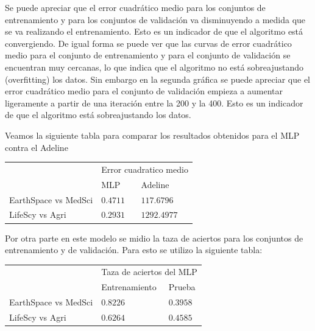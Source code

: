 \documentclass{article}
\theoremstyle{mytheoremstyle}
\theoremstyle{mytheoremstyle}
\theoremstyle{myproblemstyle}
\begin{document}
\newpage
Se puede  apreciar que el error cuadrático medio para los conjuntos de entrenamiento y para los conjuntos de validación va disminuyendo a medida que se va realizando el entrenamiento. Esto es un indicador de que el algoritmo está convergiendo. De igual forma se puede ver que las curvas de error cuadrático medio para el conjunto de entrenamiento y para el conjunto de validación se encuentran muy cercanas, lo que indica que el algoritmo no está sobreajustando (overfitting) los datos. Sin embargo en la segunda gráfica se puede apreciar que el error cuadrático medio para el conjunto de validación empieza a aumentar ligeramente a partir de una iteración entre la 200 y la 400. Esto es un indicador de que el algoritmo está sobreajustando los datos.

Veamos la siguiente tabla para comparar los resultados obtenidos para el MLP contra el Adeline

\begin{table}[!h]
  \centering
  \begin{tabular}{lll}
    \cline{2-3}
                         & \multicolumn{2}{l}{Error cuadratico medio}               \\ \cline{2-3}
                         & MLP                                        & Adeline     \\ \hline
    EarthSpace vs MedSci & $0.4711$                                   & $117.6796$  \\ \hline
    LifeScy vs Agri      & $0.2931$                                   & $1292.4977$ \\ \hline
  \end{tabular}
\end{table}

Por otra parte en este modelo se midio la taza de aciertos para los conjuntos de entrenamiento y de validación. Para esto se utilizo la siguiente tabla:

\begin{table}[!h]
  \centering
  \begin{tabular}{lll}
    \cline{2-3}
                         & \multicolumn{2}{l}{Taza de aciertos del MLP}            \\ \cline{2-3}
                         & Entrenamiento                                & Prueba   \\ \hline
    EarthSpace vs MedSci & $0.8226$                                     & $0.3958$ \\ \hline
    LifeScy vs Agri      & $0.6264$                                     & $0.4585$ \\ \hline
  \end{tabular}
\end{table}
\end{document}
